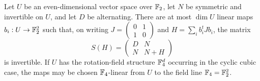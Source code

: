 \begin{lemma}
\label{lem:sa:interface}
Let $U$ be an even-dimensional vector space over $\mathbb F_2$, let $N$
be symmetric and invertible on $U$, and let $D$ be alternating.
There are at most $\dim U$ linear maps $b_i:U\to\mathbb F_2^2$ such that,
on writing
$J=\left(\begin{smallmatrix}0&1\\1&0\end{smallmatrix}\right)$ and
$H=\sum_i b_i^tJb_i$, the matrix
\begin{equation}
 S(H)=\begin{pmatrix}D&N\\N&N+H\end{pmatrix}
 \label{eq:sa:interface-matrix}
\end{equation}
is invertible.
If $U$ has the rotation-field structure $\mathbb F_4^d$ occurring in the
cyclic cubic case, the maps may be chosen $\mathbb F_4$-linear from
$U$ to the field line $\mathbb F_4=\mathbb F_2^2$.
\end{lemma}

